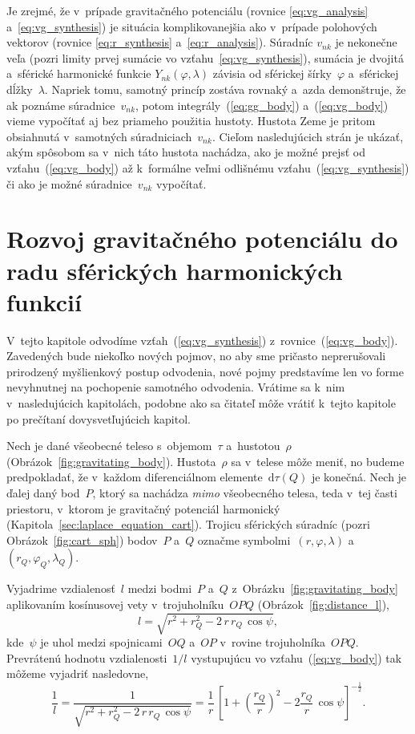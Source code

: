 \documentclass[a4paper,12pt]{book}
\newcommand{\diff}{\mathrm d}
\begin{document}
Je zrejmé, že v~prípade gravitačného potenciálu (rovnice \ref{eq:vg_analysis}
a~\ref{eq:vg_synthesis}) je situácia komplikovanejšia ako v~prípade polohových
vektorov (rovnice \ref{eq:r_synthesis} a~\ref{eq:r_analysis}).  Súradníc
$v_{nk}$ je nekonečne veľa (pozri limity prvej sumácie vo
vzťahu~\ref{eq:vg_synthesis}), sumácia je dvojitá a~sférické harmonické funkcie
$Y_{nk}(\varphi, \lambda)$ závisia od sférickej šírky~$\varphi$ a~sférickej
dĺžky~$\lambda$.  Napriek tomu, samotný princíp zostáva rovnaký a~azda
demonštruje, že ak poznáme súradnice~$v_{nk}$, potom
integrály~(\ref{eq:gg_body}) a~(\ref{eq:vg_body}) vieme vypočítať aj bez
priameho použitia hustoty.  Hustota Zeme je pritom obsiahnutá v~samotných
súradniciach~$v_{nk}$.  Cieľom nasledujúcich strán je ukázať, akým spôsobom sa
v~nich táto hustota nachádza, ako je možné prejsť od vzťahu~(\ref{eq:vg_body})
až k~formálne veľmi odlišnému vzťahu~(\ref{eq:vg_synthesis}) či ako je možné
súradnice~$v_{nk}$ vypočítať.



\section{Rozvoj gravitačného potenciálu do radu sférických harmonických
funkcií}
\label{sec:vg_sh_expansion}

V~tejto kapitole odvodíme vzťah~(\ref{eq:vg_synthesis})
z~rovnice~(\ref{eq:vg_body}).  Zavedených bude niekoľko nových pojmov, no aby 
sme pričasto neprerušovali prirodzený myšlienkový postup odvodenia, nové pojmy
predstavíme len vo forme nevyhnutnej na pochopenie samotného odvodenia.
Vrátime sa k~nim v~nasledujúcich kapitolách, podobne ako sa čitateľ môže vrátiť
k~tejto kapitole po prečítaní dovysvetľujúcich kapitol.

Nech je dané všeobecné teleso s~objemom~$\tau$ a~hustotou~$\rho$
(Obrázok~\ref{fig:gravitating_body}).  Hustota~$\rho$ sa v~telese môže meniť,
no budeme predpokladať, že v~každom diferenciálnom elemente~$\diff \tau(Q)$ je
konečná.  Nech je ďalej daný bod~$P$, ktorý sa nachádza \emph{mimo} všeobecného
telesa, teda v~tej časti priestoru, v~ktorom je gravitačný potenciál harmonický
(Kapitola~\ref{sec:laplace_equation_cart}).  Trojicu sférických súradníc (pozri
Obrázok~\ref{fig:cart_sph}) bodov~$P$ a~$Q$ označme symbolmi~$(r, \varphi,
\lambda)$ a~$(r_Q, \varphi_Q, \lambda_Q)$.

Vyjadrime vzdialenosť~$l$ medzi bodmi~$P$ a~$Q$
z~Obrázku~\ref{fig:gravitating_body} aplikovaním kosínusovej vety
v~trojuholníku~$OPQ$ (Obrázok~\ref{fig:distance_l}),
%
\begin{equation}
l = \sqrt{r^2 + r_Q^2 - 2 \, r \, r_Q \, \cos\psi}{,}
\end{equation}
%
kde~$\psi$ je uhol medzi spojnicami~$OQ$ a~$OP$ v~rovine trojuholníka~$OPQ$.
Prevrátenú hodnotu vzdialenosti~$1 \slash l$ vystupujúcu vo
vzťahu~(\ref{eq:vg_body}) tak môžeme vyjadriť nasledovne,
%
\begin{equation}
\label{eq:1l}
\frac{1}{l} = \frac{1}{\sqrt{ r^2 + r_Q^2 - 2 \, r \, r_Q \, \cos\psi
}} = \frac{1}{r} \, \left[1 + \left( \dfrac{r_Q}{r}
\right)^2 - 2 \dfrac{r_Q}{r} \, \cos\psi \right]^{-\frac{1}{2}}{.}
\end{equation}
\end{document}
